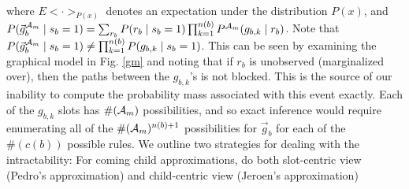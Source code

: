 \documentclass[11pt]{article}
\newcommand{\A}{{\cal A}}
\newcommand{\Am}{\A_{m}}
\begin{document}
where $E<\cdot>_{P(x)}$ denotes an expectation under the distribution $P(x)$, and $P(\vec{g}^{\Am}_{b} \mid s_b = 1) = \sum_{r_b} P(r_b \mid s_b = 1) \prod_{k=1}^{n(b)} P^{\Am}(g_{b,k} \mid r_b)$. Note that $P(\vec{g}^{\Am}_{b} \mid s_b = 1) \neq \prod_{k=1}^{n(b)} P(g_{b,k} \mid s_b=1)$. This can be seen by examining the graphical model in Fig. \ref{gm} and noting that if $r_b$ is unobserved (marginalized over), then the paths between the $g_{b,k}$'s is not blocked. This is the source of our inability to compute the probability mass associated with this event exactly. Each of the $g_{b,k}$ slots has $\#(\Am)$ possibilities, and so exact inference would require enumerating all of the $\#(\Am)^{n(b)+1}$ possibilities for $\vec{g}_{b}$ for each of the $\#(c(b))$ possible rules. We outline two strategies for dealing with the intractability: For coming child approximations, do both slot-centric view (Pedro's approximation) and child-centric view (Jeroen's approximation)


\end{document}
